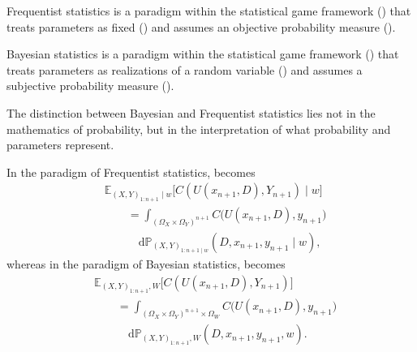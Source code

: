 \begin{definition}
	\label{def:frequentist_statistics}
	Frequentist statistics is a paradigm within the statistical game framework () that treats parameters as fixed () and assumes an objective probability measure ().
\end{definition}

\begin{definition}
	\label{def:bayesian_statistics}
	Bayesian statistics is a paradigm within the statistical game framework () that treats parameters as realizations of a random variable () and assumes a subjective probability measure ().
\end{definition}


\begin{remark}[Inference]
	The distinction between Bayesian and Frequentist statistics lies not in the mathematics of probability, but in the interpretation of what probability and parameters represent.
\end{remark}

\begin{remark}
	\label{rem:frequentist_bayesian_expected_cost}
	In the paradigm of Frequentist statistics,  becomes
	\begin{equation}
		\begin{split}
			&\mathbb{E}_{(X,Y)_{1\colon n+1}\mid w}\big[C(U(x_{n+1},D),Y_{n+1})\mid w\big] \\
			&\qquad= \int_{(\Omega_X\times\Omega_Y)^{n+1}}
			C\big(U(x_{n+1},D),y_{n+1}\big)\\
			&\qquad\quad \mathrm{d}\mathbb{P}_{(X,Y)_{1\colon n+1\mid w}}(D,x_{n+1},y_{n+1}\mid w),
		\end{split}
		\label{eq:expcost5}
	\end{equation}
 	whereas in the paradigm of Bayesian statistics,  becomes
 	\begin{equation}
 		\begin{split}
 			&\mathbb{E}_{(X,Y)_{1\colon n+1},W}\big[C(U(x_{n+1},D),Y_{n+1})\big] \\
 			&\qquad= \int_{(\Omega_X\times\Omega_Y)^{n+1}\times\Omega_W}
 			C\big(U(x_{n+1},D),y_{n+1}\big)\\
 			&\qquad\quad
 			\mathrm{d}\mathbb{P}_{(X,Y)_{1\colon n+1},W }(D,x_{n+1},y_{n+1},w).
 		\end{split}
 		\label{eq:expcost6}
 	\end{equation}
\end{remark}



